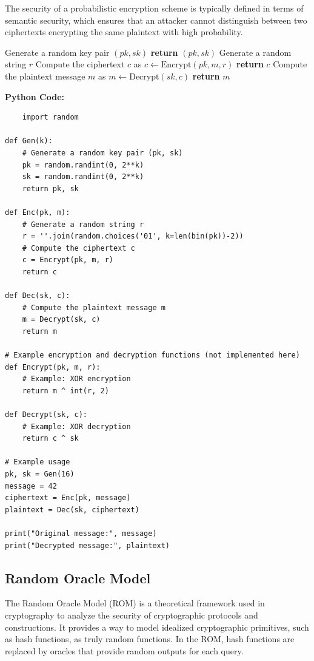 \documentclass[12pt]{book} %
\begin{document}
The security of a probabilistic encryption scheme is typically defined in terms of semantic security, which ensures that an attacker cannot distinguish between two ciphertexts encrypting the same plaintext with high probability.
\FloatBarrier
\begin{algorithm}[H]
\caption{Probabilistic Encryption Scheme}
\begin{algorithmic}[1]
    \State Generate a random key pair $(pk, sk)$
    \State \textbf{return} $(pk, sk)$
\EndFunction
{}
    \State Generate a random string $r$
    \State Compute the ciphertext $c$ as $c \gets \text{Encrypt}(pk, m, r)$
    \State \textbf{return} $c$
\EndFunction
{}
    \State Compute the plaintext message $m$ as $m \gets \text{Decrypt}(sk, c)$
    \State \textbf{return} $m$
\EndFunction
\end{algorithmic}
\end{algorithm}
\FloatBarrier
\textbf{Python Code:}
\FloatBarrier
\begin{lstlisting}
    import random

def Gen(k):
    # Generate a random key pair (pk, sk)
    pk = random.randint(0, 2**k)
    sk = random.randint(0, 2**k)
    return pk, sk

def Enc(pk, m):
    # Generate a random string r
    r = ''.join(random.choices('01', k=len(bin(pk))-2))
    # Compute the ciphertext c
    c = Encrypt(pk, m, r)
    return c

def Dec(sk, c):
    # Compute the plaintext message m
    m = Decrypt(sk, c)
    return m

# Example encryption and decryption functions (not implemented here)
def Encrypt(pk, m, r):
    # Example: XOR encryption
    return m ^ int(r, 2)

def Decrypt(sk, c):
    # Example: XOR decryption
    return c ^ sk

# Example usage
pk, sk = Gen(16)
message = 42
ciphertext = Enc(pk, message)
plaintext = Dec(sk, ciphertext)

print("Original message:", message)
print("Decrypted message:", plaintext)
\end{lstlisting}
\FloatBarrier

\subsection{Random Oracle Model}

The Random Oracle Model (ROM) is a theoretical framework used in cryptography to analyze the security of cryptographic protocols and constructions. It provides a way to model idealized cryptographic primitives, such as hash functions, as truly random functions. In the ROM, hash functions are replaced by oracles that provide random outputs for each query.
\end{document}
